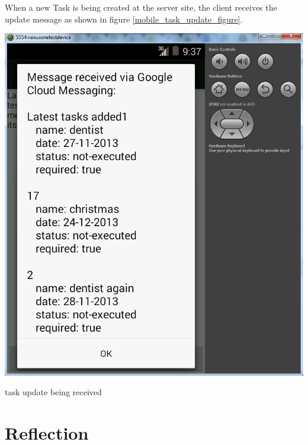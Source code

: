 \pagebreak
When a new Task is being created at the server site, the client receives the update message as shown in figure \ref{mobile_task_update_figure}.
\begin{center}
	\centering
	\includegraphics[scale=0.7]{images/googlecloud__tasksindevice.png}
	\caption{task update being received}
	\label{mobile_task_update_figure}
\end{center}


\section{Reflection}

